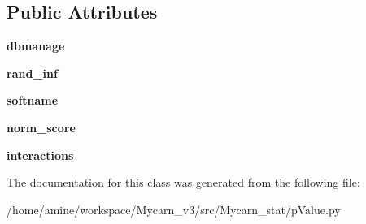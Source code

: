 \subsection*{\-Public \-Attributes}
\begin{DoxyCompactItemize}
\item 
\hypertarget{classMycarn__stat_1_1pValue_1_1pValue_a3e09fd52bebccaaaed497c5d92acf64d}{
{\bfseries dbmanage}}
\label{classMycarn__stat_1_1pValue_1_1pValue_a3e09fd52bebccaaaed497c5d92acf64d}

\item 
\hypertarget{classMycarn__stat_1_1pValue_1_1pValue_a98d15b46670eff0ab0bc96fb5969f7e6}{
{\bfseries rand\-\_\-inf}}
\label{classMycarn__stat_1_1pValue_1_1pValue_a98d15b46670eff0ab0bc96fb5969f7e6}

\item 
\hypertarget{classMycarn__stat_1_1pValue_1_1pValue_aae6139d0348ddb8ae2007e3cd718af74}{
{\bfseries softname}}
\label{classMycarn__stat_1_1pValue_1_1pValue_aae6139d0348ddb8ae2007e3cd718af74}

\item 
\hypertarget{classMycarn__stat_1_1pValue_1_1pValue_ac4d43cc3564e4d2a2bdc7698f0e8b26b}{
{\bfseries norm\-\_\-score}}
\label{classMycarn__stat_1_1pValue_1_1pValue_ac4d43cc3564e4d2a2bdc7698f0e8b26b}

\item 
\hypertarget{classMycarn__stat_1_1pValue_1_1pValue_a29d68bef82364bd29d9e8e0ac7022a6d}{
{\bfseries interactions}}
\label{classMycarn__stat_1_1pValue_1_1pValue_a29d68bef82364bd29d9e8e0ac7022a6d}

\end{DoxyCompactItemize}


\-The documentation for this class was generated from the following file\-:\begin{DoxyCompactItemize}
\item 
/home/amine/workspace/\-Mycarn\-\_\-v3/src/\-Mycarn\-\_\-stat/p\-Value.\-py\end{DoxyCompactItemize}
